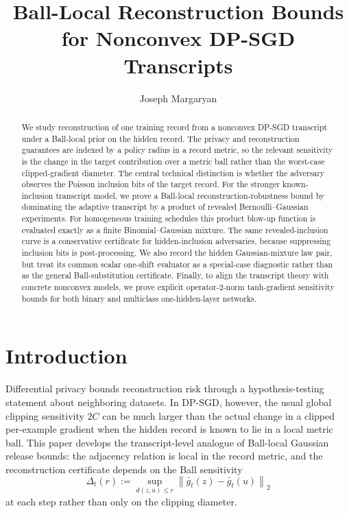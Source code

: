 \documentclass[conference,compsoc]{IEEEtran}
\title{Ball-Local Reconstruction Bounds for Nonconvex DP-SGD Transcripts}
\author{
Joseph Margaryan
}
\newcommand{\norm}[1]{\left\lVert #1\right\rVert}
\begin{document}
\maketitle

\begin{abstract}
We study reconstruction of one training record from a nonconvex DP-SGD
transcript under a Ball-local prior on the hidden record.  The privacy and
reconstruction guarantees are indexed by a policy radius in a record metric,
so the relevant sensitivity is the change in the target contribution over a
metric ball rather than the worst-case clipped-gradient diameter.  The central
technical distinction is whether the adversary observes the Poisson inclusion
bits of the target record.  For the stronger known-inclusion transcript model,
we prove a Ball-local reconstruction-robustness bound by dominating the
adaptive transcript by a product of revealed Bernoulli--Gaussian experiments.
For homogeneous training schedules this product blow-up function is evaluated
exactly as a finite Binomial--Gaussian mixture.  The same revealed-inclusion
curve is a conservative certificate for hidden-inclusion adversaries, because
suppressing inclusion bits is post-processing.  We also record the hidden
Gaussian-mixture law pair, but treat its common scalar one-shift evaluator as a
special-case diagnostic rather than as the general Ball-substitution
certificate.  Finally, to align the transcript theory with concrete nonconvex
models, we prove explicit operator-2-norm tanh-gradient sensitivity bounds for
both binary and multiclass one-hidden-layer networks.
\end{abstract}

\section{Introduction}
\label{sec:introduction}

Differential privacy bounds reconstruction risk through a hypothesis-testing
statement about neighboring datasets.  In DP-SGD, however, the usual global
clipping sensitivity $2C$ can be much larger than the actual change in a
clipped per-example gradient when the hidden record is known to lie in a local
metric ball.  This paper develops the transcript-level analogue of Ball-local
Gaussian release bounds: the adjacency relation is local in the record metric,
and the reconstruction certificate depends on the Ball sensitivity
\[
\Delta_t(r)
:=
\sup_{d(z,u)\le r}
\norm{\bar g_t(z)-\bar g_t(u)}_2
\]
at each step rather than only on the clipping diameter.
\end{document}
